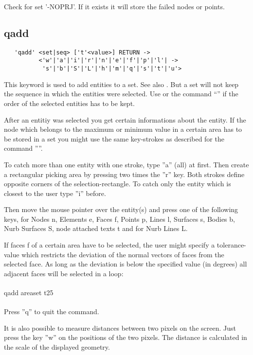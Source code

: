 \documentclass{article}
\begin{document}
Check for set '-NOPRJ'. If it exists it will store the failed nodes or points.

\subsection{\label{qadd}qadd}
\begin{verbatim}
   'qadd' <set|seq> ['t'<value>] RETURN ->
          <'w'|'a'|'i'|'r'|'n'|'e'|'f'|'p'|'l'| ->
           's'|'b'|'S'|'L'|'h'|'m'|'q'|'s'|'t'|'u'> 
\end{verbatim}
This keyword is used to add entities to a set. See also . But a set will not keep the sequence in which the entities were selected. Use  or the command ``'' if the order of the selected entities has to be kept. 

After an entitiy was selected you get certain informations about the entity. If the node which belongs to the maximum or minimum value in a certain area has to be stored in a set you might use the same key-strokes as described for the command ''''.

To catch more than one entity with one stroke, type ''a'' (all) at first. Then create a rectangular picking area by pressing two times the ''r'' key. Both strokes define opposite corners of the selection-rectangle. To catch only the entity which is closest to the user type ''i'' before.

Then move the mouse pointer over the entity(s) and press one of the following keys, for Nodes n, Elements e, Faces f, Points p, Lines l, Surfaces s, Bodies b, Nurb Surfaces S, node attached texts t and for Nurb Lines L.

If faces f of a certain area have to be selected, the user might specify a tolerance-value which restricts the deviation of the normal vectors of faces from the selected face. As long as the deviation is below the specified value (in degrees) all adjacent faces will be selected in a loop:\\\\ qadd areaset t25\\\\

Press ''q'' to quit the command. 

It is also possible to measure distances between two pixels on the screen. Just press the key ''w'' on the positions of the two pixels. The distance is calculated in the scale of the displayed geometry.
\end{document}
